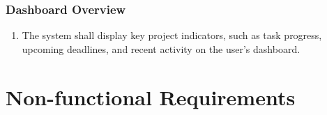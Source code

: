 \documentclass[]{article}
\begin{document}
            \subsubsection{Dashboard Overview}
            \begin{enumerate}[label=\scriptsize\textbf{\textcolor{gray}{FR-ALL-\arabic{allCounter}}}, leftmargin=*, itemsep=-4px]
                \item The system shall display key project indicators, such as task progress, upcoming deadlines, and recent activity on the user’s dashboard.
            \end{enumerate}



    \newpage


    \section{Non-functional Requirements}
\end{document}

